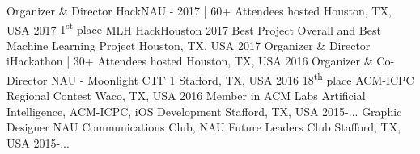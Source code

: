 \begin{cvhonors}
  \cvhonor
    {Organizer \& Director}
    {HackNAU - 2017 | 60+ Attendees hosted}
    {Houston, TX, USA}
    {2017} 
  \cvhonor
    {1\textsuperscript{st} place}
    {MLH HackHouston 2017 Best Project Overall and Best Machine Learning Project}
    {Houston, TX, USA}
    {2017} 
  \cvhonor
    {Organizer \& Director}
    {iHackathon | 30+ Attendees hosted}
    {Houston, TX, USA}
    {2016}
  \cvhonor
    {Organizer \& Co-Director}
    {NAU - Moonlight CTF 1}
    {Stafford, TX, USA}
    {2016} 
   \cvhonor
   	{18\textsuperscript{th} place}
   	{ACM-ICPC Regional Contest}
    {Waco, TX, USA}
    {2016}
   \cvhonor
    {Member in ACM Labs}
    {Artificial Intelligence, ACM-ICPC, iOS Development}
    {Stafford, TX, USA}
    {2015-...}
   \cvhonor
    {Graphic Designer}
    {NAU Communications Club, NAU Future Leaders Club}
    {Stafford, TX, USA}
    {2015-...} 
   
    
   
\end{cvhonors}
